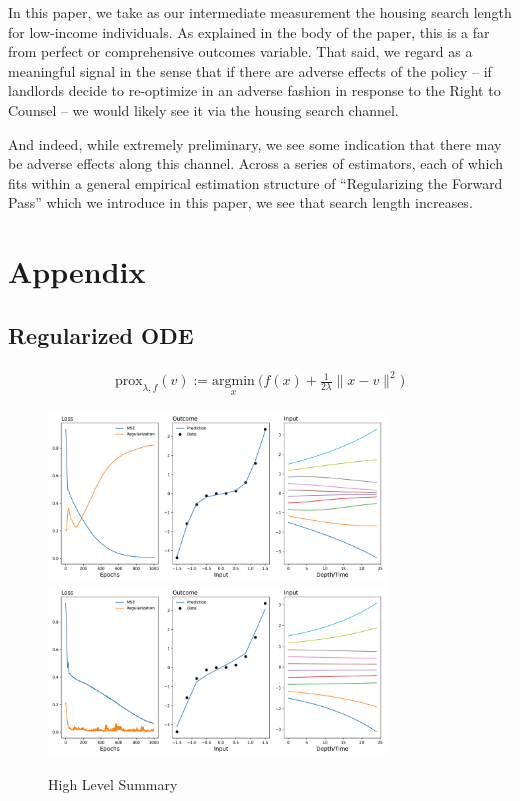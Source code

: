 \documentclass[a4paper,12pt]{article}
\begin{document}
In this paper, we take as our intermediate measurement the housing search length for low-income individuals. As explained in the body of the paper, this is a far from perfect or comprehensive outcomes variable. That said, we regard as a meaningful signal in the sense that if there are adverse effects of the policy -- if landlords decide to re-optimize in an adverse fashion in response to the Right to Counsel -- we would likely see it via the housing search channel. \par 
And indeed, while extremely preliminary, we see some indication that there may be adverse effects along this channel. Across a series of estimators, each of which fits within a general empirical estimation structure of ``Regularizing the Forward Pass'' which we introduce in this paper, we see that search length increases.

%


\section{Appendix}

\subsection{Regularized ODE}
\begin{align*}
    \textrm{prox}_{\lambda, f}(v) := \underset{x}{\textrm{argmin}} \ \Big( f(x) + \frac{1}{2\lambda} \| x - v \|^2\Big)
\end{align*}
\begin{figure}[htbp]
\centering
\includegraphics[width=0.8\textwidth]{figures/framework/reg_ode_0.0.png}
\includegraphics[width=0.8\textwidth]{figures/framework/reg_ode_10.0.png}
        \caption{High Level Summary}
        \label{fig:hls}
\end{figure}
\end{document}
